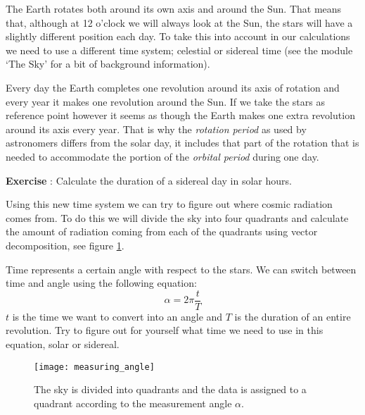 The Earth rotates both around its own axis and around the Sun. That means that, although at 12 o'clock we will always look at the Sun, the stars will have a slightly different position each day. To take this into account in our calculations we need to use a different time system; celestial or sidereal time (see the module `The Sky' for a bit of background information).

Every day the Earth completes one revolution around its axis of rotation and every year it makes one revolution around the Sun. If we take the stars as reference point however it seems as though the Earth makes one extra revolution around its axis every year. That is why the \textit{rotation period} as used by astronomers differs from the solar day, it includes that part of the rotation that is needed to accommodate the portion of the \textit{orbital period} during one day.

\begin{shaded}
\textbf{Exercise \theExercise {}} : Calculate the duration of a sidereal day in solar hours.\end{shaded}

Using this new time system we can try to figure out where cosmic radiation comes from. To do this we will divide the sky into four quadrants and calculate the amount of radiation coming from each of the quadrants using vector decomposition, see figure \ref{fig:measuring_angle}.

Time represents a certain angle with respect to the stars. We can switch between time and angle using the following equation:
\begin{equation} \alpha = 2 \pi \frac{t}{T} \label{eq:time} \end{equation}
$t$ is the time we want to convert into an angle and $T$ is the duration of an entire revolution. Try to figure out for yourself what time we need to use in this equation, solar or sidereal.

\begin{figure}\begin{center}
\texttt{[image: measuring\_angle]}
\caption{The sky is divided into quadrants and the data is assigned to a quadrant according to the measurement angle $\alpha$.}\label{fig:measuring_angle}
\end{center}\end{figure}

